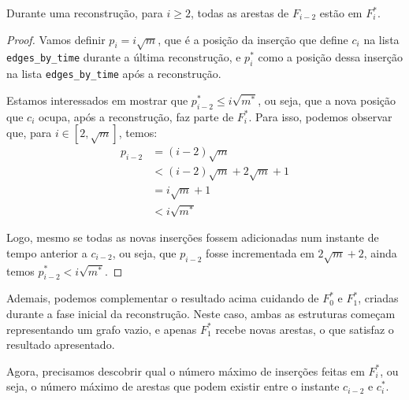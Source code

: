 \begin{theorem}
    \label{teo:adicao-arestas}
    Durante uma reconstrução, para $i \geq 2$, todas as arestas de $F_{i-2}$ estão em $F_i^*$.
\end{theorem}
\begin{proof}

    Vamos definir $p_i = i \sqrt{m}$, que é a posição da inserção que define $c_i$ na lista \texttt{edges\_by\_time} durante a última reconstrução, e $p_i^*$ como a posição dessa inserção na lista \texttt{edges\_by\_time} após a reconstrução.

    Estamos interessados em mostrar que $p_{i-2}^* \leq i\sqrt{m^*}$, ou seja, que a nova posição que $c_i$ ocupa, após a reconstrução, faz parte de $F_i^*$. Para isso, podemos observar que, para $i \in [2, \sqrt{m}]$, temos:
    \begin{align*}
        p_{i-2} & = (i-2) \sqrt{m}                 \\
                & < (i-2) \sqrt{m} + 2\sqrt{m} + 1 \\
                & = i \sqrt{m} + 1                 \\
                & < i \sqrt{m^*}
    \end{align*}

    Logo, mesmo se todas as novas inserções fossem adicionadas num instante de tempo anterior a $c_{i-2}$, ou seja, que $p_{i-2}$ fosse incrementada em $2\sqrt{m} + 2$, ainda temos $p_{i-2}^* < i \sqrt{m^*}$.
\end{proof}

Ademais, podemos complementar o resultado acima cuidando de $F_0^*$ e $F_1^*$, criadas durante a fase inicial da reconstrução. Neste caso, ambas as estruturas começam representando um grafo vazio, e apenas $F_1^*$ recebe novas arestas, o que satisfaz o resultado apresentado.

Agora, precisamos descobrir qual o número máximo de inserções feitas em $F_i^*$, ou seja, o número máximo de arestas que podem existir entre o instante $c_{i-2}$ e $c_i^*$.


